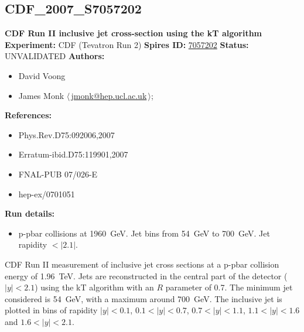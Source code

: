 \subsection[CDF\_2007\_S7057202]{CDF\_2007\_S7057202\,\cite{Abulencia:2007ez}}
\textbf{CDF Run II inclusive jet cross-section using the kT algorithm}\newline
\textbf{Experiment:} CDF (Tevatron Run 2) \newline
\textbf{Spires ID:} \href{http://www.slac.stanford.edu/spires/find/hep/www?rawcmd=key+7057202}{7057202}\newline
\textbf{Status:} UNVALIDATED\newline
\textbf{Authors:}
\begin{itemize}
  \item David Voong
  \item James Monk $\langle\,$\href{mailto:jmonk@hep.ucl.ac.uk}{jmonk@hep.ucl.ac.uk}$\,\rangle$;
\end{itemize}
\textbf{References:}
\begin{itemize}
  \item Phys.Rev.D75:092006,2007
  \item Erratum-ibid.D75:119901,2007
  \item FNAL-PUB 07/026-E
  \item hep-ex/0701051
\end{itemize}
\textbf{Run details:}
\begin{itemize}

  \item p-pbar collisions at 1960~GeV. Jet \pT bins from 54~GeV to 700~GeV.  Jet rapidity $< |2.1|$.\end{itemize}

\noindent CDF Run II measurement of inclusive jet cross sections at a p-pbar collision energy of 1.96~TeV. Jets are reconstructed in the central part of the detector ($|y|<2.1$) using the kT algorithm with an $R$ parameter of 0.7. The minimum jet \pT considered is 54~GeV, with a maximum around 700~GeV.  The inclusive jet \pT is plotted in bins of rapidity $|y|<0.1$, $0.1<|y|<0.7$, $0.7<|y|<1.1$, $1.1<|y|<1.6$ and $1.6<|y|<2.1$.

\clearpage


\clearpage


